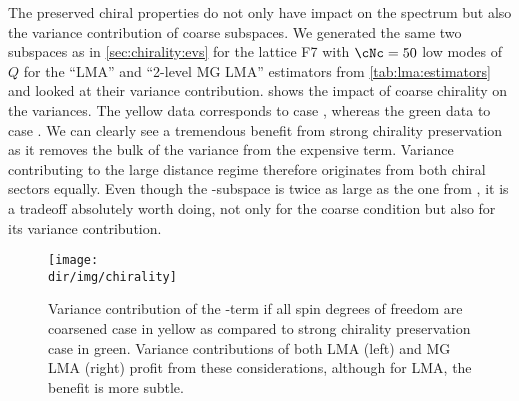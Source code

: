 The preserved chiral properties do not only have impact on the spectrum but also the variance contribution of coarse subspaces.
We generated the same two subspaces as in \cref{sec:chirality:evs} for the lattice F7 with $\cNc=50$ low modes of $Q$ for the ``LMA'' and ``2-level MG LMA'' estimators from \cref{tab:lma:estimators} and looked at their  variance contribution.
 shows the impact of coarse chirality on the variances.
The yellow data corresponds to case , whereas the green data to case .
We can clearly see a tremendous benefit from strong chirality preservation as it removes the bulk of the variance from the expensive  term.
Variance contributing to the large distance regime therefore originates from both chiral sectors equally.
Even though the -subspace is twice as large as the one from , it is a tradeoff absolutely worth doing, not only for the coarse condition but also for its variance contribution.
\begin{figure}
\centering
\texttt{[image: \\dir/img/chirality]}
\caption{
Variance contribution of the -term if all spin degrees of freedom are coarsened case  in yellow as compared to strong chirality preservation case  in green.
Variance contributions of both LMA (left) and MG LMA (right) profit from these considerations, although for LMA, the benefit is more subtle.
\takenfull
}
\label{fig:chirality:variance}
\end{figure}





